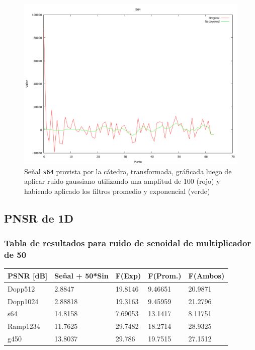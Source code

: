 \begin{figure}[H]
\begin {center}
\includegraphics[width=500pt]{imagenes/s64-gauss100-both-spec.png}
\end {center}
\caption{Se\~nal \texttt{s64} provista por la c\'atedra, transformada, gr\'aficada
luego de aplicar ruido gaussiano utilizando una amplitud de 100 (rojo) y 
habiendo aplicado los filtros promedio y exponencial (verde)}
\label{fig:scomb}
\end{figure}

\subsection{PNSR de 1D}
\subsubsection{Tabla de resultados para ruido de senoidal de multiplicador de 50}

\begin{table}[H]
        \begin{tabular}{|l|llll|}
                \hline
                \textbf{PSNR [dB]} & Se\~nal + 50*Sin & F(Exp) & F(Prom.) & F(Ambos) \\ \hline
                    Dopp512 & 2.8847 & 19.8146 & 9.46651 & 20.9871 \\
                    Dopp1024 & 2.88818 & 19.3163 & 9.45959 & 21.2796 \\
                    s64 & 14.8158 & 7.69053 & 13.1417 & 8.11751 \\
                    Ramp1234 & 11.7625 & 29.7482 & 18.2714 & 28.9325 \\
                    g450 & 13.8037 & 29.786 & 19.7515 & 27.1512 \\ \hline
                    \end{tabular}
                \end{table}

